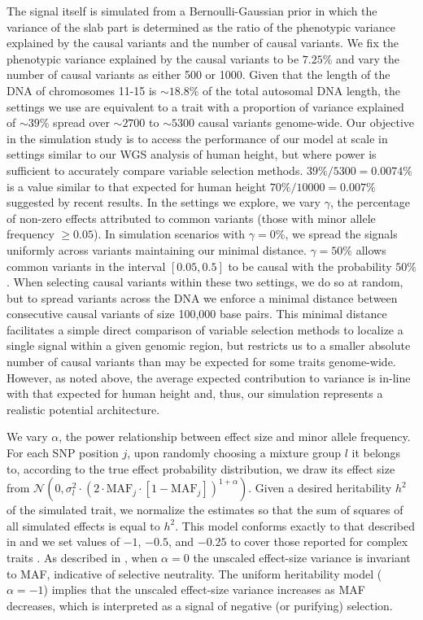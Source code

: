 The signal itself is simulated from a Bernoulli-Gaussian prior in which the variance of the slab part is determined as the ratio of the phenotypic variance explained by the causal variants and the number of causal variants. We fix the phenotypic variance explained by the causal variants to be $7.25\%$ and vary the number of causal variants as either 500 or 1000. Given that the length of the DNA of chromosomes 11-15 is $\sim18.8\%$ of the total autosomal DNA length, the settings we use are equivalent to a trait with a proportion of variance explained of $\sim 39\%$ spread over $\sim 2700$ to $\sim 5300$ causal variants genome-wide. Our objective in the simulation study is to access the performance of our model at scale in settings similar to our WGS analysis of human height, but where power is sufficient to accurately compare variable selection methods. $39\%/5300 = 0.0074\%$ is a value similar to that expected for human height $70\%/10000 = 0.007\%$ suggested by recent results\cite{HTbig}. In the settings we explore, we vary $\gamma$, the percentage of non-zero effects attributed to common variants (those with minor allele frequency $\geq0.05$). In simulation scenarios with $\gamma=0\%$, we spread the signals uniformly across variants maintaining our minimal distance. $\gamma=50\%$ allows common variants in the interval $[0.05, 0.5]$ to be causal with the probability $50\%$. When selecting causal variants within these two settings, we do so at random, but to spread variants across the DNA we enforce a minimal distance between consecutive causal variants of size 100,000 base pairs. This minimal distance facilitates a simple direct comparison of variable selection methods to localize a single signal within a given genomic region, but restricts us to a smaller absolute number of causal variants than may be expected for some traits genome-wide. However, as noted above, the average expected contribution to variance is in-line with that expected for human height and, thus, our simulation represents a realistic potential architecture.

We vary $\alpha$, the power relationship between effect size and minor allele frequency. For each SNP position $j$, upon randomly choosing a mixture group $l$ it belongs to, according to the true effect probability distribution, we draw its effect size from $\mathcal{N}(0, \sigma_l^2 \cdot (2 \cdot\text{MAF}_j \cdot [1-\text{MAF}_j] )^{1+\alpha})$. Given a desired heritability $h^2$ of the simulated trait, we normalize the estimates so that the sum of squares of all simulated effects is equal to $h^2$. This model conforms exactly to that described in \cite{speed2017reevaluation} and we set values of $-1$, $-0.5$, and $-0.25$ to cover those reported for complex traits \cite{speed2017reevaluation}. As described in \cite{speed2017reevaluation}, when $\alpha = 0$ the unscaled effect-size variance is invariant to MAF, indicative of selective neutrality. The uniform heritability model ($\alpha = -1$) implies that the unscaled effect-size variance increases as MAF decreases, which is interpreted as a signal of negative (or purifying) selection. 

